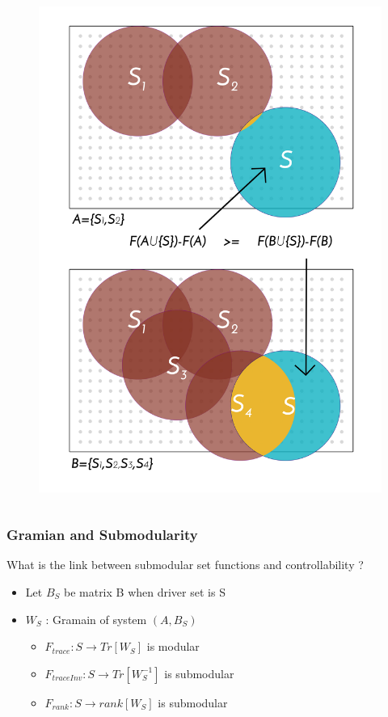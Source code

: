 \documentclass[xcolor=dvipsnames]{beamer}
\begin{document}
\begin{frame}
\begin{columns}
\begin{column}{.4\textwidth}
\begin{figure}
				\includegraphics[scale=.25]{figure_1}
			\end{figure}	
		\end{column}
	\end{columns}
\end{frame}

\begin{frame}
	\frametitle{Gramian and Submodularity}

	What is the link between submodular set functions and controllability ?
	\begin{itemize}
		\item Let $B_S$ be matrix B when driver set is S
		\item $W_S $ : Gramain of system $ (A,B_S) $ 	
		\begin{itemize}
			\item $F_{trace}:S \longrightarrow Tr[W_S] $ is modular
			\item $F_{traceInv}:S \longrightarrow Tr[W_S^{-1}] $ is submodular
			\item $F_{rank}:S \longrightarrow rank[W_S] $ is submodular
		\end{itemize}	
	\end{itemize}
\end{frame}
\end{document}
